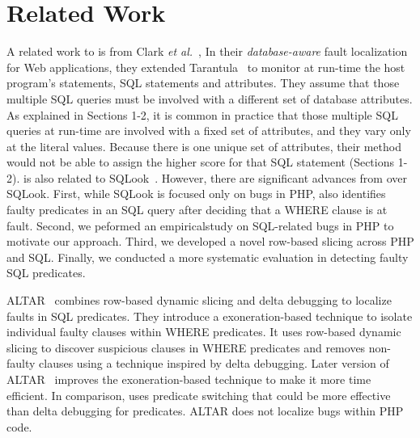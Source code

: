 \section{Related Work}

A related work to {\tool} is from Clark {\em et al.}~\cite{ga-ase11},
In their {\em database-aware} fault localization for Web applications,
they extended Tarantula~\cite{tarantula05} to monitor at run-time the
host program's statements, SQL statements and attributes.
They assume that those multiple SQL queries must be involved with a
different set of database attributes. As explained in Sections 1-2,
it is common in practice that those multiple SQL queries at run-time
are involved with a fixed set of attributes, and they vary only at the
literal values.
Because there is one unique set of attributes, their method would not
be able to assign the higher score for that SQL statement (Sections
1-2).  {\tool} is also related to SQLook~\cite{icsm13}. However, there
are significant advances from {\tool} over SQLook. First, while SQLook
is focused only on bugs in PHP, {\tool} also identifies faulty
predicates in an SQL query after deciding that a WHERE clause is at
fault. Second, we peformed an empiricalstudy on SQL-related bugs in
PHP to motivate our approach. Third, we developed a novel row-based
slicing across PHP and SQL. Finally, we conducted a more systematic
evaluation in detecting faulty SQL predicates.

ALTAR~\cite{altar-icst17} combines row-based dynamic slicing and delta
debugging to localize faults in SQL predicates. They introduce a
exoneration-based technique to isolate individual faulty clauses
within WHERE predicates. It uses row-based dynamic slicing to discover
suspicious clauses in WHERE predicates and removes non-faulty
clauses using a technique inspired by delta debugging. Later version
of ALTAR~\cite{altar-jss19} improves the exoneration-based technique
to make it more time efficient. In comparison, {\tool} uses predicate
switching that could be more effective than delta debugging for
predicates. ALTAR does not localize bugs within PHP code.

